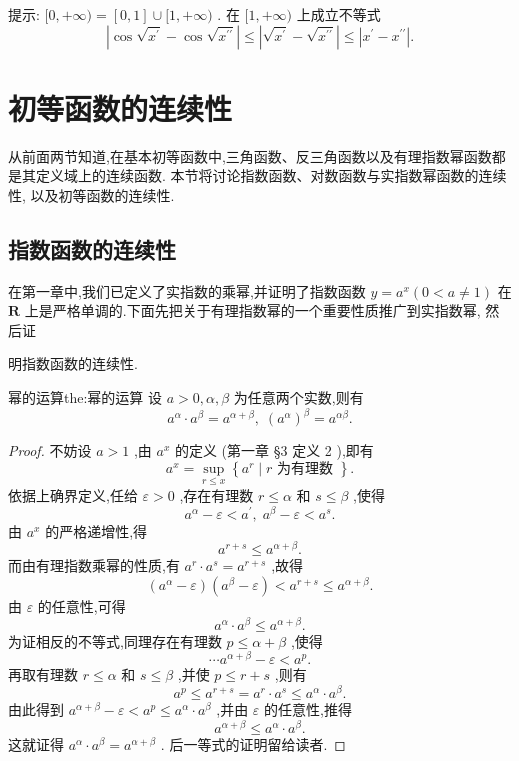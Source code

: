 提示: \(\lbrack 0, + \infty ) = \left\lbrack  {0,1}\right\rbrack   \cup  \lbrack 1, + \infty )\) . 在 \(\lbrack 1, + \infty )\) 上成立不等式
\[
\left| {\cos \sqrt{{x}^{\prime }} - \cos \sqrt{{x}^{\prime \prime }}}\right|  \leq  \left| {\sqrt{{x}^{\prime }} - \sqrt{{x}^{\prime \prime }}}\right|  \leq  \left| {{x}^{\prime } - {x}^{\prime \prime }}\right| .
\]

\section{初等函数的连续性}

从前面两节知道,在基本初等函数中,三角函数、反三角函数以及有理指数幂函数都是其定义域上的连续函数. 本节将讨论指数函数、对数函数与实指数幂函数的连续性, 以及初等函数的连续性.

\subsection{指数函数的连续性}

在第一章中,我们已定义了实指数的乘幂,并证明了指数函数 \(y = {a}^{x}\left( {0 < a \neq  1}\right)\) 在 \(\mathbf{R}\) 上是严格单调的.下面先把关于有理指数幂的一个重要性质推广到实指数幂, 然后证

明指数函数的连续性.

\begin{theorem}{幂的运算}{the:幂的运算}
设 \(a > 0,\alpha ,\beta\) 为任意两个实数,则有
\[
{a}^{\alpha } \cdot  {a}^{\beta } = {a}^{\alpha  + \beta },\;{\left( {a}^{\alpha }\right) }^{\beta } = {a}^{\alpha \beta }.
\]
\end{theorem}

\begin{proof}
不妨设 \(a > 1\) ,由 \({a}^{x}\) 的定义 (第一章 §3 定义 2 ),即有
\[
{a}^{x} = \mathop{\sup }\limits_{{r \leq  x}}\left\{  {{a}^{r} \mid  r\text{ 为有理数 }}\right\}  .
\]
依据上确界定义,任给 \(\varepsilon  > 0\) ,存在有理数 \(r \leq  \alpha\) 和 \(s \leq  \beta\) ,使得
\[
{a}^{\alpha } - \varepsilon  < {a}^{\prime },\;{a}^{\beta } - \varepsilon  < {a}^{s}.
\]
由 \({a}^{x}\) 的严格递增性,得
\[
{a}^{r + s} \leq  {a}^{\alpha  + \beta }.
\]
而由有理指数乘幂的性质,有 \({a}^{r} \cdot  {a}^{s} = {a}^{r + s}\) ,故得
\[
\left( {{a}^{\alpha } - \varepsilon }\right) \left( {{a}^{\beta } - \varepsilon }\right)  < {a}^{r + s} \leq  {a}^{\alpha  + \beta }.
\]
由 \(\varepsilon\) 的任意性,可得
\[
{a}^{\alpha } \cdot  {a}^{\beta } \leq  {a}^{\alpha  + \beta }.
\]
为证相反的不等式,同理存在有理数 \(p \leq  \alpha  + \beta\) ,使得
\[
\cdots {a}^{\alpha  + \beta } - \varepsilon  < {a}^{p}.
\]
再取有理数 \(r \leq  \alpha\) 和 \(s \leq  \beta\) ,并使 \(p \leq  r + s\) ,则有
\[
{a}^{p} \leq  {a}^{r + s} = {a}^{r} \cdot  {a}^{s} \leq  {a}^{\alpha } \cdot  {a}^{\beta }.
\]
由此得到 \({a}^{\alpha  + \beta } - \varepsilon  < {a}^{p} \leq  {a}^{\alpha } \cdot  {a}^{\beta }\) ,并由 \(\varepsilon\) 的任意性,推得
\[
{a}^{\alpha  + \beta } \leq  {a}^{\alpha } \cdot  {a}^{\beta }.
\]
这就证得 \({a}^{\alpha } \cdot  {a}^{\beta } = {a}^{\alpha  + \beta }\) . 后一等式的证明留给读者.
\end{proof}


